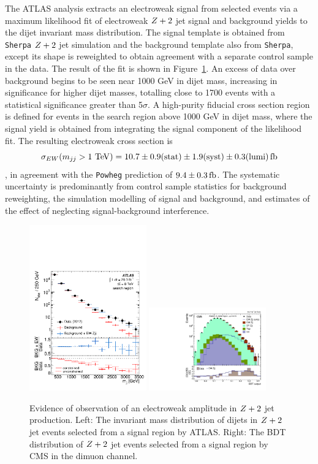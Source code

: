 The ATLAS analysis extracts an electroweak signal from selected events via a maximum likelihood fit
of electroweak $Z+2$ jet signal and background yields to the dijet invariant mass distribution.
The signal template is obtained from \texttt{Sherpa} $Z+2$ jet simulation and the background template also from \texttt{Sherpa},
except its shape is reweighted to obtain agreement with a separate control sample in the data.
The result of the fit is shown in Figure~\ref{fig:ss-exclboson-z2j-8tev}.  An excess of data over background begins to be seen
near 1000 GeV in dijet mass, increasing in significance for higher dijet masses, totalling close to 1700 events with a statistical
significance greater than 5$\sigma$.   A high-purity fiducial cross section region is defined for events in the search
region above 1000 GeV in dijet mass, where the signal yield is obtained from integrating the signal component of the likelihood fit.
The resulting electroweak cross section is
$$\sigma_{EW} (m_{jj} > 1 \TeV) = 10.7 \pm 0.9 \rm{(stat)} \pm 1.9 \rm{(syst)} \pm 0.3 \rm{(lumi)} \rm{\,fb}$$,
in agreement with the \texttt{Powheg} prediction of $9.4\pm0.3 \rm{\,fb}$.  The systematic uncertainty is predominantly from
control sample statistics for background reweighting, the simulation modelling of signal and background,
and estimates of the effect of neglecting signal-background interference.

\begin{figure}[p]
    \centering
    \includegraphics[width=0.45\textwidth]{figures/ss-exclboson-z2j-atlas8tev.pdf}
    \includegraphics[width=0.45\textwidth]{figures/ss-exclboson-z2j-cms8tev.pdf}
    \caption{Evidence of observation of an electroweak amplitude in $Z+2$ jet production.
    Left:  The invariant mass distribution of dijets in $Z+2$ jet events selected
     from a signal region by ATLAS.
    Right:  The BDT distribution of $Z+2$ jet events selected from a signal region
    by CMS in the dimuon channel.}
    \label{fig:ss-exclboson-z2j-8tev}
\end{figure}

